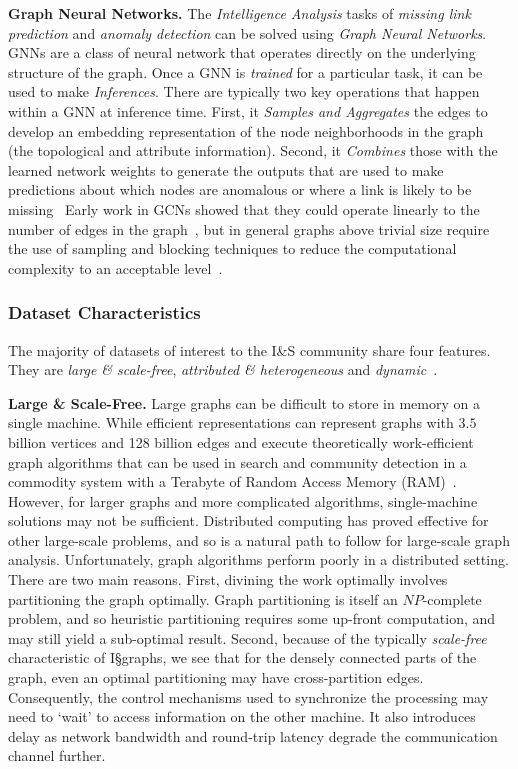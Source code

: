 \textbf{Graph Neural Networks.}
The \textit{Intelligence Analysis} tasks of \textit{missing link prediction} and \textit{anomaly detection} can be solved using \textit{Graph Neural Networks}. 
GNNs are a class of neural network that operates directly on the underlying structure of the graph. 
Once a GNN is \textit{trained} for a particular task, it can be used to make \textit{Inferences}.
There are typically two key operations that happen within a GNN at inference time. 
First, it \textit{Samples and Aggregates} the edges to develop an embedding representation of the node neighborhoods in the graph (the topological and attribute information). 
Second, it \textit{Combines} those with the learned network weights to generate the outputs that are used to make predictions about which nodes are anomalous or where a link is likely to be missing~\cite{Hamilton2017}
Early work in GCNs showed that they could operate linearly to the number of edges in the graph~\cite{Kipf2016}, but in general graphs above trivial size require the use of sampling and blocking techniques to reduce the computational complexity to an acceptable level~\cite{Hamilton2017}.

\subsubsection{Dataset Characteristics}

The majority of datasets of interest to the I\&S community share four features. 
They are \textit{large \& scale-free}, \textit{attributed \& heterogeneous} and \textit{dynamic}~\cite{Regli2022a}.

\textbf{Large \& Scale-Free.}
Large graphs can be difficult to store in memory on a single machine. 
While efficient representations can represent graphs with $3.5$ billion vertices and 128 billion edges and execute theoretically work-efficient graph algorithms that can be used in search and community detection in a commodity system with a Terabyte of Random Access Memory (RAM)~\cite{Dhulipala2018}. 
However, for larger graphs and more complicated algorithms, single-machine solutions may not be sufficient. 
Distributed computing has proved effective for other large-scale problems, and so is a natural path to follow for large-scale graph analysis. 
Unfortunately, graph algorithms perform poorly in a distributed setting. 
There are two main reasons. 
First, divining the work optimally involves partitioning the graph optimally. 
Graph partitioning is itself an $NP$-complete problem, and so heuristic partitioning requires some up-front computation, and may still yield a sub-optimal result. 
Second, because of the typically \textit{scale-free} characteristic of I\S graphs, we see that for the densely connected parts of the graph, even an optimal partitioning may have cross-partition edges. 
Consequently, the control mechanisms used to synchronize the processing may need to `wait' to access information on the other machine. 
It also introduces delay as network bandwidth and round-trip latency degrade the communication channel further. 

